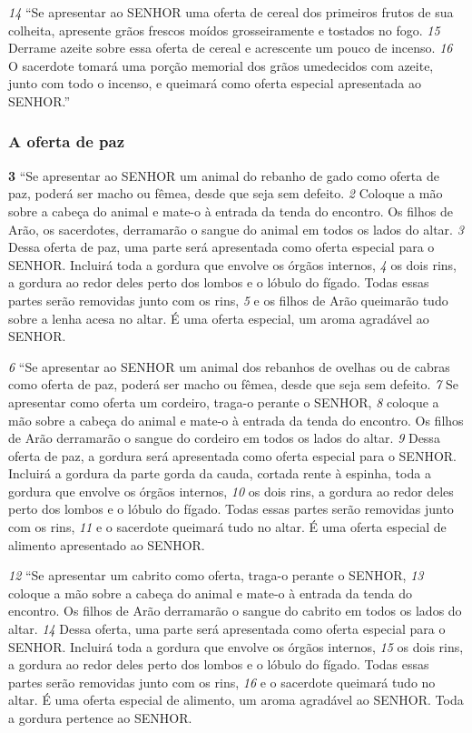 \smallskip
\textit{\tiny 14}
“Se apresentar ao SENHOR uma oferta de cereal dos primeiros frutos de sua
colheita, apresente grãos frescos moídos grosseiramente e tostados no fogo.
\textit{\tiny 15}
Derrame azeite sobre essa oferta de cereal e acrescente um pouco de incenso.
\textit{\tiny 16}
O sacerdote tomará uma porção memorial dos grãos umedecidos com azeite,
junto com todo o incenso, e queimará como oferta especial apresentada ao
SENHOR.”

\bigskip
\subsubsection*{A oferta de paz}
\textbf{\large 3} “Se apresentar ao SENHOR um animal do rebanho de gado como oferta de paz,
poderá ser macho ou fêmea, desde que seja sem defeito. 
\textit{\tiny 2} 
Coloque a mão sobre a
cabeça do animal e mate-o à entrada da tenda do encontro. Os filhos de Arão, os
sacerdotes, derramarão o sangue do animal em todos os lados do altar. 
\textit{\tiny 3} 
Dessa
oferta de paz, uma parte será apresentada como oferta especial para o SENHOR.
Incluirá toda a gordura que envolve os órgãos internos, 
\textit{\tiny 4} 
os dois rins, a gordura ao
redor deles perto dos lombos e o lóbulo do fígado. Todas essas partes serão
removidas junto com os rins, 
\textit{\tiny 5} 
e os filhos de Arão queimarão tudo sobre a lenha
acesa no altar. É uma oferta especial, um aroma agradável ao SENHOR. 

\smallskip
\textit{\tiny 6} 
“Se apresentar ao SENHOR um animal dos rebanhos de ovelhas ou de cabras
como oferta de paz, poderá ser macho ou fêmea, desde que seja sem defeito. 
\smallskip
\textit{\tiny 7} 
Se
apresentar como oferta um cordeiro, traga-o perante o SENHOR, 
\textit{\tiny 8} 
coloque a mão
sobre a cabeça do animal e mate-o à entrada da tenda do encontro. Os filhos de
Arão derramarão o sangue do cordeiro em todos os lados do altar. 
\textit{\tiny 9} 
Dessa oferta
de paz, a gordura será apresentada como oferta especial para o SENHOR. Incluirá a
gordura da parte gorda da cauda, cortada rente à espinha, toda a gordura que
envolve os órgãos internos, 
\textit{\tiny 10}
os dois rins, a gordura ao redor deles perto dos
lombos e o lóbulo do fígado. Todas essas partes serão removidas junto com os
rins, 
\textit{\tiny 11}
e o sacerdote queimará tudo no altar. É uma oferta especial de alimento
apresentado ao SENHOR.
   
\smallskip
\textit{\tiny 12}
“Se apresentar um cabrito como oferta, traga-o perante o SENHOR, 
\textit{\tiny 13}
coloque a
mão sobre a cabeça do animal e mate-o à entrada da tenda do encontro. Os filhos
de Arão derramarão o sangue do cabrito em todos os lados do altar. 
\textit{\tiny 14}
Dessa
oferta, uma parte será apresentada como oferta especial para o SENHOR. Incluirá
toda a gordura que envolve os órgãos internos, 
\textit{\tiny 15}
os dois rins, a gordura ao redor
deles perto dos lombos e o lóbulo do fígado. Todas essas partes serão removidas
junto com os rins, 
\textit{\tiny 16}
e o sacerdote queimará tudo no altar. É uma oferta especial
de alimento, um aroma agradável ao SENHOR. Toda a gordura pertence ao SENHOR.
  
